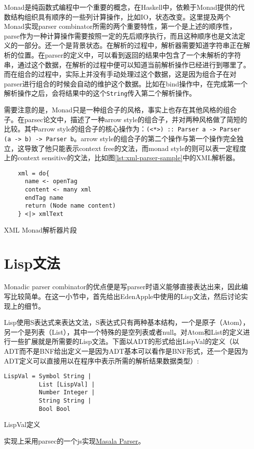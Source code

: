 Monad是纯函数式编程中一个重要的概念，在Haskell中，依赖于Monad提供的代数结构组织具有顺序的一些列计算操作，比如IO，状态改变。这里提及两个Monad实现parser combinator所需的两个重要特性，第一个是上述的顺序性，parse作为一种计算操作需要按照一定的先后顺序执行，而且这种顺序也是文法定义的一部分。还一个是背景状态。在解析的过程中，解析器需要知道字符串正在解析的位置。在parser的定义中，可以看到返回的结果中包含了一个未解析的字符串，通过这个数据，在解析的过程中便可以知道当前解析操作已经进行到哪里了。而在组合的过程中，实际上并没有手动处理过这个数据，这是因为组合子在对parser进行组合的时候会自动的维护这个数据。比如在bind操作中，在完成第一个解析操作之后，会将结果中的这个\texttt{String}传入第二个解析操作。

需要注意的是，Monad只是一种组合子的风格，事实上也存在其他风格的组合子。在parsec论文\cite{leijen01parsec}中，描述了一种arrow style的组合子，并对两种风格做了简短的比较。其中arrow style的组合子的核心操作为：\texttt{(<*>) :: Parser a -> Parser (a -> b) -> Parser b}。arrow style的组合子的第二个操作与第一个操作完全独立，这导致了他只能表示context free的文法，而monad style的则可以表一定程度上的context sensitive的文法，比如图\ref{lst:xml-parser-sample}中的XML解析器。

\begin{code}
  \begin{verbatim}
    xml = do{
      name <- openTag
      content <- many xml
      endTag name
      return (Node name content)
    } <|> xmlText
  \end{verbatim}
  \caption{XML Monad解析器片段}
  \label{lst:xml-parser-sample}
\end{code}

\section{Lisp文法}

Monadic parser combinator的优点便是写parser时语义能够直接表达出来，因此编写比较简单。在这一小节中，首先给出EdenApple中使用的Lisp文法，然后讨论实现上的细节。

Lisp使用S表达式来表达文法，S表达式只有两种基本结构，一个是原子（Atom），另一个是列表（List），其中一个特殊的是空列表或者null。对Atom和List的定义进行一些扩展就是所需要的Lisp文法。下面以ADT的形式给出LispVal的定义（以ADT而不是BNF给出定义一是因为ADT基本可以看作是BNF形式，还一个是因为ADT定义可以直接用以在程序中表示所需的解析结果数据类型）:

\begin{listing}
\begin{verbatim}
LispVal = Symbol String |
          List [LispVal] |
          Number Integer |
          String String |
          Bool Bool
\end{verbatim}
\caption{LispVal定义}
\label{lst:lisp-val-def}
\end{listing}

实现上采用parsec的一个js实现\href{https://github.com/d-plaindoux/parsec}{Masala Parser}。
